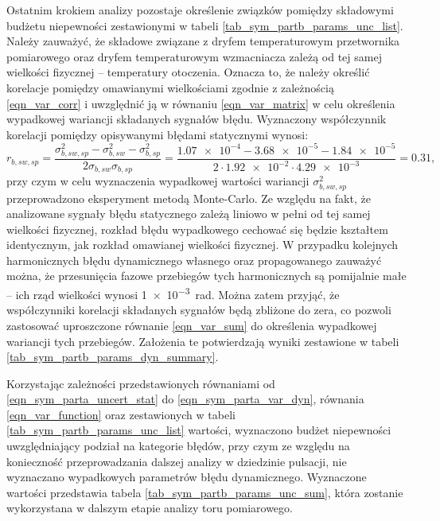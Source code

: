 Ostatnim krokiem analizy pozostaje określenie związków pomiędzy składowymi budżetu niepewności zestawionymi w tabeli \ref{tab_sym_partb_params_unc_list}. Należy zauważyć, że składowe związane z dryfem temperaturowym przetwornika pomiarowego oraz dryfem temperaturowym wzmacniacza zależą od tej samej wielkości fizycznej -- temperatury otoczenia. Oznacza to, że należy określić korelacje pomiędzy omawianymi wielkościami zgodnie z zależnością \eqref{eqn_var_corr} i uwzględnić ją w równaniu \eqref{eqn_var_matrix} w celu określenia wypadkowej wariancji składanych sygnałów błędu. Wyznaczony współczynnik korelacji pomiędzy opisywanymi błędami statycznymi wynosi:
\begin{equation}
r_{b,sw,sp} = \frac{\sigma_{b,sw,sp}^{2} - \sigma_{b,sw}^{2} - \sigma_{b,sp}^{2}}{2 \sigma_{b,sw} \sigma_{b,sp}} = \frac{\num{1.07e-4} - \num{3.68e-5} - \num{1.84e-5}}{2 \cdot \num{1.92e-2} \cdot \num{4.29e-3}} = 0.31 \label{eqn_sym_partb_stat_corr},
\end{equation}
przy czym w celu wyznaczenia wypadkowej wartości wariancji $\sigma_{b,sw,sp}^{2}$ przeprowadzono eksperyment metodą Monte-Carlo. Ze względu na fakt, że analizowane sygnały błędu statycznego zależą liniowo w pełni od tej samej wielkości fizycznej, rozkład błędu wypadkowego cechować się będzie kształtem identycznym, jak rozkład omawianej wielkości fizycznej. W przypadku kolejnych harmonicznych błędu dynamicznego własnego oraz propagowanego zauważyć można, że przesunięcia fazowe przebiegów tych harmonicznych są pomijalnie małe -- ich rząd wielkości wynosi \qty{1e-3}{rad}. Można zatem przyjąć, że współczynniki korelacji składanych sygnałów będą zbliżone do zera, co pozwoli zastosować uproszczone równanie \eqref{eqn_var_sum} do określenia wypadkowej wariancji tych przebiegów. Założenia te potwierdzają wyniki zestawione w tabeli \ref{tab_sym_partb_params_dyn_summary}.

Korzystając zależności przedstawionych równaniami od \eqref{eqn_sym_parta_uncert_stat} do \eqref{eqn_sym_parta_var_dyn}, równania \eqref{eqn_var_function} oraz zestawionych w tabeli \ref{tab_sym_partb_params_unc_list} wartości, wyznaczono budżet niepewności uwzględniający podział na kategorie błędów, przy czym ze względu na konieczność przeprowadzania dalszej analizy w dziedzinie pulsacji, nie wyznaczano wypadkowych parametrów błędu dynamicznego. Wyznaczone wartości przedstawia tabela \ref{tab_sym_partb_params_unc_sum}, która zostanie wykorzystana w dalszym etapie analizy toru pomiarowego. 

